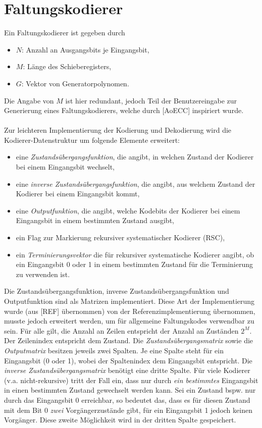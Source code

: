 \section{Faltungskodierer}
\label{kapitel:implementierung_faltungskodierer}
Ein Faltungskodierer ist gegeben durch 
\begin{itemize}
\item $N$: Anzahl an Ausgangsbits je Eingangsbit,
\item $M$: Länge des Schieberegisters,
\item $G$: Vektor von Generatorpolynomen.
\end{itemize}
Die Angabe von $M$ ist hier redundant, jedoch Teil der Benutzereingabe zur Generierung eines Faltungskodierers, welche durch [AoECC] inspiriert wurde.
\\
\\
Zur leichteren Implementierung der Kodierung und Dekodierung wird die Kodierer-Datenstruktur um folgende Elemente erweitert:
\begin{itemize}
\item eine \emph{Zustandsübergangsfunktion}, die angibt, in welchen Zustand der Kodierer bei einem Eingangsbit wechselt,
\item eine \emph{inverse Zustandsübergangsfunktion}, die angibt, aus welchem Zustand der Kodierer bei einem Eingangsbit kommt,
\item eine \emph{Outputfunktion}, die angibt, welche Kodebits der Kodierer bei einem Eingangsbit in einem bestimmten Zustand ausgibt,
\item ein Flag zur Markierung rekursiver systematischer Kodierer (RSC),
\item ein \emph{Terminierungsvektor} die für rekursiver systematische Kodierer angibt, ob ein Eingangsbit 0 oder 1 in einem bestimmten Zustand für die Terminierung zu verwenden ist.
\end{itemize}
Die Zustandsübergangsfunktion, inverse Zustandsübergangsfunktion und Outputfunktion sind als Matrizen implementiert. Diese Art der Implementierung wurde (aus [REF] übernommen) von der Referenzimplementierung übernommen, musste jedoch erweitert werden, um für allgemeine Faltungskodes verwendbar zu sein. Für alle gilt, die Anzahl an Zeilen entspricht der Anzahl an Zuständen $2^{M}$. Der Zeilenindex entspricht dem Zustand. Die \emph{Zustandsübergangsmatrix} sowie die \emph{Outputmatrix} besitzen jeweils zwei Spalten. Je eine Spalte steht für ein Eingangsbit (0 oder 1), wobei der Spaltenindex dem Eingangsbit entspricht. Die \emph{inverse Zustandsübergangsmatrix} benötigt eine dritte Spalte. Für viele Kodierer (v.a. nicht-rekursive) tritt der Fall ein, dass nur durch \emph{ein bestimmtes} Eingangsbit in einen bestimmten Zustand gewechselt werden kann. Sei ein Zustand bspw. nur durch das Eingangsbit 0 erreichbar, so bedeutet das, dass es für diesen Zustand mit dem Bit 0 \emph{zwei} Vorgängerzustände gibt, für ein Eingangsbit 1 jedoch keinen Vorgänger. Diese zweite Möglichkeit wird in der dritten Spalte gespeichert.
